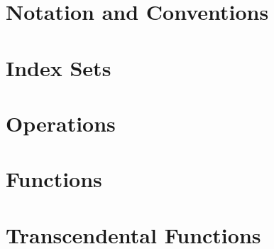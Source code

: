 \section{Notation and Conventions}

\section{Index Sets}

\section{Operations}

\section{Functions}

\section{Transcendental Functions}
